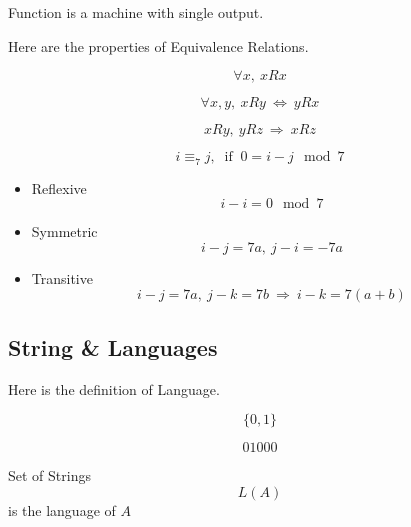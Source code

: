 \begin{definition}[Function]
    Function is a machine with single output.
\end{definition}


\begin{definition*}
Here are the properties of Equivalence Relations.
\begin{definition}[reflexive]
    \[
    \forall x, \ xRx
    \]
\end{definition}
\begin{definition}[symmetric]
    \[
    \forall x,y, \ xRy \ \Longleftrightarrow \ yRx
    \]
\end{definition}
\begin{definition}[transitive]
    \[
    xRy,\ yRz \ \Longrightarrow \ xRz
    \]
\end{definition}    
\end{definition*}

\begin{eg}
    \[
    i \equiv_{7} j, \ \text{ if }\ 0 = i - j \mod 7 
    \]
\end{eg}
\begin{itemize}
    \item Reflexive
    \[
    i-i = 0 \mod 7
    \]
    \item Symmetric
    \[
    i-j = 7a, \ j-i = -7a
    \]
    \item Transitive
    \[
    i - j = 7a,\ j - k = 7b \ \Longrightarrow \ i - k = 7(a + b)
    \]
\end{itemize}

\subsection{String \& Languages}

\begin{definition*}
    Here is the definition of Language.
    \begin{eg}[Alphabet]
        \[
        \{0, 1\}
        \]
    \end{eg}
    \begin{eg}[String]
        \[
        01000
        \]
    \end{eg}
    \begin{definition}[Language]
        Set of Strings
        \[
        L(A)
        \]
        is the language of $A$
    \end{definition}
\end{definition*}

